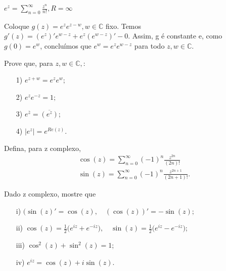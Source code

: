 \documentclass[complex.tex]{subfiles}
\begin{document}
\begin{example}
	$e^z = \sum_{n=0}^{\infty}\frac{z^n}{n!}, R = \infty$
\end{example}
Coloque $g(z) = e^ze^{z-w}, w\in\mathbb{C}$ fixo. Temos $g'(z) = (e^z)'e^{w-z} + e^z(e^{w-z})' - 0.$
Assim, g é constante e, como $g(0) = e^w$, concluímos que $e^w = e^ze^{w-z}$ para todo
$z, w\in\mathbb{C}$.
\begin{exer*}
	Prove que, para $z, w\in\mathbb{C},$:
	\begin{itemize}
		\item[1)] $e^{z+w} = e^ze^w;$
		\item[2)] $e^ze^{-z} = 1;$
		\item[3)] $e^{\overline{z}} = \overline{(e^z)}$;
		\item[4)] $|e^z| = e^{Re(z)}.$
	\end{itemize}
\end{exer*}
\begin{example}
	Defina, para z complexo,
	\begin{align*}
		 & \cos{(z)} = \sum_{n=0}^{\infty}(-1)^n\frac{z^{2n}}{(2n)!}      \\
		 & \sin{(z)} = \sum_{n=0}^{\infty}(-1)^n\frac{z^{2n+1}}{(2n+1)!}.
	\end{align*}
\end{example}
\begin{exer*}
	Dado z complexo, mostre que
	\begin{itemize}
		\item[i)] $(\sin{(z)}' = \cos{(z)}, \quad (\cos{(z)})' = -\sin{(z)};$
		\item[ii)] $\cos{(z)} = \frac{1}{2}\biggl(e^{iz} + e^{-iz}\biggr), \quad \sin{(z)} = \frac{1}{2}
			      \biggl(e^{iz} - e^{-iz}\biggr)$;
		\item[iii)] $\cos^2{(z)} + \sin^2{(z)} = 1$;
		\item[iv)] $e^{iz} = \cos{(z)} + i\sin{(z)}.$
	\end{itemize}
\end{exer*}
\end{document}
